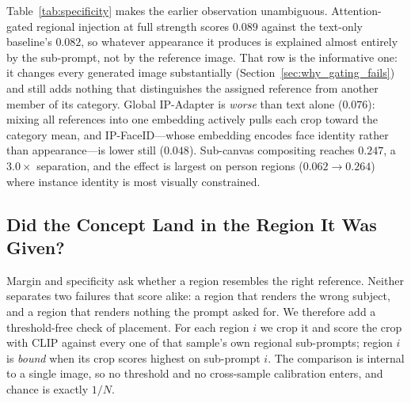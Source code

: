 \documentclass[10pt,twocolumn,letterpaper]{article}
\begin{document}
Table~\ref{tab:specificity} makes the earlier observation unambiguous.
Attention-gated regional injection at full strength scores $0.089$ against
the text-only baseline's $0.082$, so whatever appearance it produces is
explained almost entirely by the sub-prompt, not by the reference image.
That row is the informative one: it changes every generated image
substantially (Section~\ref{sec:why_gating_fails}) and still adds nothing
that distinguishes the assigned reference from another member of its
category.  Global
IP-Adapter is \emph{worse} than text alone ($0.076$): mixing all
references into one embedding actively pulls each crop toward the
category mean, and IP-FaceID---whose embedding encodes face identity
rather than appearance---is lower still ($0.048$).  Sub-canvas
compositing reaches $0.247$, a
$3.0\times$ separation, and the effect is largest on person regions
($0.062\!\to\!0.264$) where instance identity is most visually
constrained.
\subsection{Did the Concept Land in the Region It Was Given?}
\label{sec:binding}

Margin and specificity ask whether a region resembles the right reference.
Neither separates two failures that score alike: a region that renders the
wrong subject, and a region that renders nothing the prompt asked for.  We
therefore add a threshold-free check of placement.  For each region $i$ we
crop it and score the crop with CLIP against every one of that sample's own
regional sub-prompts; region $i$ is \emph{bound} when its crop scores highest
on sub-prompt $i$.  The comparison is internal to a single image, so no
threshold and no cross-sample calibration enters, and chance is exactly
$1/N$.
\end{document}
